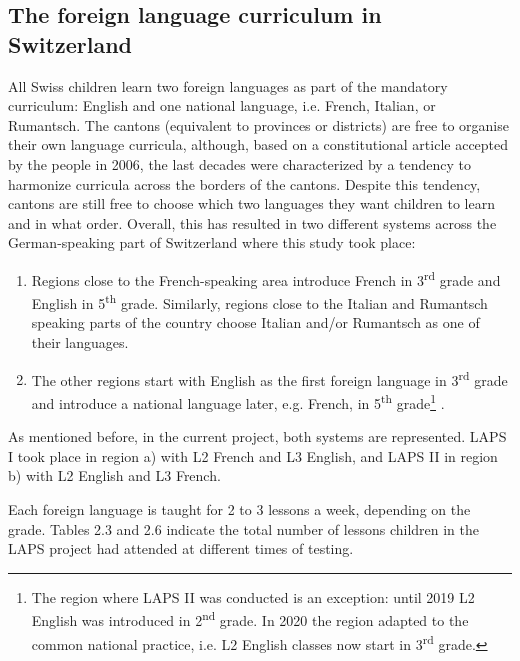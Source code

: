 \documentclass[output=paper]{langsci/langscibook}
\begin{document}
 \subsection{The foreign language curriculum in Switzerland}


All Swiss children learn two foreign languages as part of the mandatory curriculum: English and one national language, i.e. French, Italian, or Rumantsch. The cantons (equivalent to provinces or districts) are free to organise their own language curricula, although, based on a constitutional article accepted by the people in 2006, the last decades were characterized by a tendency to harmonize curricula across the borders of the cantons. Despite this tendency, cantons are still free to choose which two languages they want children to learn and in what order. Overall, this has resulted in two different systems across the German-speaking part of Switzerland where this study took place:

\begin{enumerate}[label=\alph*.]
\item Regions close to the French-speaking area introduce French in 3\textsuperscript{rd} grade and English in 5\textsuperscript{th} grade. Similarly, regions close to the Italian and Rumantsch speaking parts of the country choose Italian and/or Rumantsch as one of their languages.
\item The other regions start with English as the first foreign language in 3\textsuperscript{rd} grade and introduce a national language later, e.g. French, in 5\textsuperscript{th} grade\footnote{The region where LAPS II was conducted is an exception: until 2019 L2 English was introduced in 2\textsuperscript{nd} grade. In 2020 the region adapted to the common national practice, i.e. L2 English classes now start in 3\textsuperscript{rd} grade.} .
\end{enumerate}

As mentioned before, in the current project, both systems are represented. LAPS I took place in region a) with L2 French and L3 English, and LAPS II in region b) with L2 English and L3 French.

Each foreign language is taught for 2 to 3 lessons a week, depending on the grade. Tables 2.3 and 2.6 indicate the total number of lessons children in the LAPS project had attended at different times of testing. 
\end{document}
